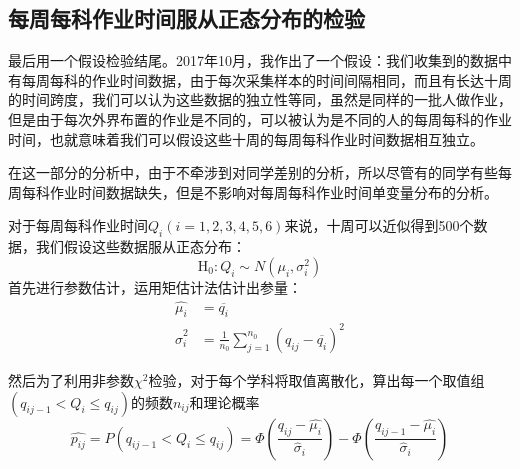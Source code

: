 \documentclass{article}
\begin{document}
\begin{CJK}{UTF8}{song}

\section{每周每科作业时间服从正态分布的检验}
最后用一个假设检验结尾。2017年10月，我作出了一个假设：我们收集到的数据中有每周每科的作业时间数据，由于每次采集样本的时间间隔相同，而且有长达十周的时间跨度，我们可以认为这些数据的独立性等同，虽然是同样的一批人做作业，但是由于每次外界布置的作业是不同的，可以被认为是不同的人的每周每科的作业时间，也就意味着我们可以假设这些十周的每周每科作业时间数据相互独立。

在这一部分的分析中，由于不牵涉到对同学差别的分析，所以尽管有的同学有些每周每科作业时间数据缺失，但是不影响对每周每科作业时间单变量分布的分析。

对于每周每科作业时间$Q_i(i=1,2,3,4,5,6)$来说，十周可以近似得到500个数据，我们假设这些数据服从正态分布：
\begin{equation}
  \textrm{H}_0:Q_i \sim N(\mu_i,\sigma_i^2)
\end{equation}
首先进行参数估计，运用矩估计法估计出参量：
\begin{align}
  \hat{\mu_i}&=\overline{q_i}\\
  \hat{\sigma}_i^2&=\frac{1}{n_0}\sum_{j=1}^{n_0}(q_{ij}-\overline{q_i})^2
\end{align}

然后为了利用非参数$\chi^2$检验，对于每个学科将取值离散化，算出每一个取值组$(q_{ij-1} < Q_i \leqslant q_{ij})$的频数$n_{ij}$和理论概率
\begin{equation}
  \hat{p_{ij}}=P(q_{ij-1}< Q_i \leqslant q_{ij})=\Phi\left( \frac{q_{ij}-\hat{\mu_i}}{\hat{\sigma}_i} \right) - \Phi\left( \frac{q_{ij-1}-\hat{\mu_i}}{\hat{\sigma}_i} \right)
\end{equation}


\end{CJK}
\end{document}
